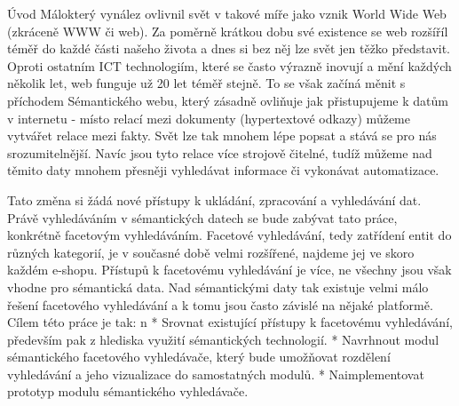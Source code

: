 \chap Úvod
Málokterý vynález ovlivnil svět v takové míře jako vznik World Wide Web (zkráceně WWW či web). Za poměrně krátkou dobu své existence se web rozšíříl téměř do každé části našeho života a dnes si bez něj 
lze svět jen těžko představit. Oproti ostatním ICT technologiím, které se často výrazně inovují a mění každých několik let, web funguje už 20 let téměř stejně.
To se však začíná měnit s příchodem Sémantického webu, který zásadně ovliňuje jak přistupujeme k datům v internetu - místo relací mezi dokumenty (hypertextové odkazy) můžeme vytvářet relace mezi fakty. 
Svět lze tak mnohem lépe popsat a stává se pro nás srozumitelnější. Navíc jsou tyto relace více strojově čitelné, tudíž můžeme nad těmito daty mnohem přesněji vyhledávat informace či vykonávat automatizace. 


Tato změna si žádá nové přístupy k ukládání, zpracování a vyhledávání dat. Právě vyhledáváním v sémantických datech se bude zabývat tato práce, konkrétně facetovým vyhledáváním. Facetové vyhledávání, tedy 
zatřídení entit do různých kategorií, je v současné době velmi rozšířené, najdeme jej ve skoro každém e-shopu. Přístupů k facetovému vyhledávání je více, ne všechny jsou však vhodne pro sémantická data.
Nad sémantickými daty tak existuje velmi málo řešení facetového vyhledávání a k tomu jsou často závislé na nějaké platformě.
Cílem této práce je tak:
\begitems \style n
* Srovnat existující přístupy k facetovému vyhledávání, především pak z hlediska využití sémantických technologií.
* Navrhnout modul sémantického facetového vyhledávače, který bude umožňovat rozdělení vyhledávání a jeho vizualizace do samostatných modulů.
* Naimplementovat prototyp modulu sémantického vyhledávače.
\enditems